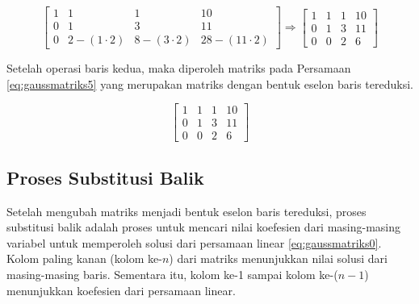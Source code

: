\begin{center}
	\setlength\arraycolsep{10pt}
	\begin{equation}
		\begin{bmatrix}
				1 	& 1 							& 1 							& 10 		\\[1em]
				0 	& 1 							& 3 							& 11 		\\[1em]
				0 	& 2 - (1\cdot2) 	& 8 - (3\cdot2) 	& 28 - (11\cdot2)
		\end{bmatrix} \Rightarrow
		\begin{bmatrix}
				1 	& 1 	& 1 	& 10 		\\[1em]
				0 	& 1 	& 3 	& 11 		\\[1em]
				0 	& 0 	& 2 	& 6
		\end{bmatrix} \label{eq:gaussmatriks4}
	\end{equation}
\end{center}

Setelah operasi baris kedua, maka diperoleh matriks pada Persamaan \ref{eq:gaussmatriks5} yang merupakan matriks dengan bentuk eselon baris tereduksi.

\begin{center}
	\setlength\arraycolsep{10pt}
	\begin{equation}
		\begin{bmatrix}
				1 	& 1 	& 1 	& 10 		\\[1em]
				0 	& 1 	& 3 	& 11 		\\[1em]
				0 	& 0 	& 2 	& 6
		\end{bmatrix} \label{eq:gaussmatriks5}
	\end{equation}
\end{center}

\subsection{Proses Substitusi Balik}

Setelah mengubah matriks menjadi bentuk eselon baris tereduksi, proses substitusi balik adalah proses untuk mencari nilai koefesien dari masing-masing variabel untuk memperoleh solusi dari persamaan linear \ref{eq:gaussmatriks0}. Kolom paling kanan (kolom ke-\begin{math}n\end{math}) dari matriks menunjukkan nilai solusi dari masing-masing baris. Sementara itu, kolom ke-1 sampai kolom ke-(\begin{math}n-1\end{math}) menunjukkan koefesien dari persamaan linear.

